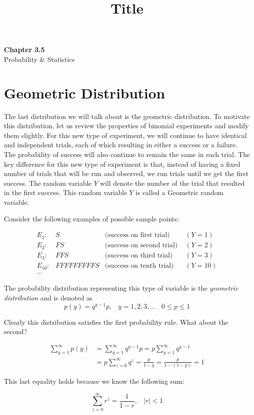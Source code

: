 \documentclass[11pt]{article}
\theoremstyle{definition}
\begin{document}
\title{Title}

\thispagestyle{empty}

\begin{center}
{\LARGE \bf Chapter 3.5}\\
{\large Probability \& Statistics}
\end{center}

\section{Geometric Distribution}

The last distribution we will talk about is the geometric distribution. To motivate this distribution, let us review the properties of binomial experiments and modify them slightly. For this new type of experiment, we will continue to have identical and independent trials, each of which resulting in either a success or a failure. The probability of success will also continue to remain the same in each trial. The key difference for this new type of experiment is that, instead of having a fixed number of trials that will be run and observed, we run trials until we get the first success. The random variable $Y$ will denote the number of the trial that resulted in the first success. This random variable $Y$ is called a Geometric random variable.

Consider the following examples of possible sample points:

$$
	\begin{aligned}
		E_1: & S & \text{(success on first trial) } & (Y=1) \\
		E_2: & FS & \text{(success on second trial) } & (Y=2) \\
		E_3: & FFS & \text{(success on third trial) } & (Y=3) \\
		E_{10}: & FFFFFFFFFS & \text{(success on tenth trial) } & (Y=10) \\
		\cdots & & &
	\end{aligned}
$$

\begin{shaded}
	The probability distribution representing this type of variable is the \textit{geometric distribution} and is denoted as
	$$
		p(y) = q^{y-1}p, \;\;\; y=1, 2, 3, \ldots \;\;\; 0 \leq p \leq 1
	$$
\end{shaded}

Clearly this distribution satisfies the first probability rule. What about the second?

$$
	\begin{aligned}
		\sum_{y=1}^\infty p(y) & = \sum_{y=1}^\infty q^{y-1}p = p \sum_{y=1}^\infty q^{y-1} \\
		& = p \sum_{z=0}^\infty q^z = \frac{p}{1-q} = \frac{p}{1-(1-p)} = 1
	\end{aligned}
$$

This last equality holds because we know the following sum:

$$
	\sum_{z=0}^\infty r^z = \frac{1}{1-r}, \;\;\; |r| < 1
$$
\end{document}
